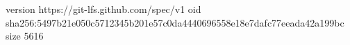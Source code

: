 version https://git-lfs.github.com/spec/v1
oid sha256:5497b21e050c5712345b201e57c0da4440696558e18e7dafc77eeada42a199bc
size 5616

